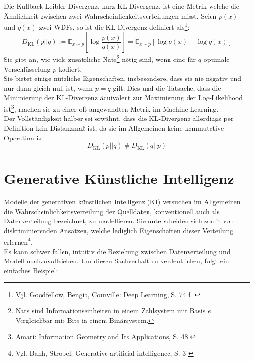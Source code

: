 Die Kullback-Leibler-Divergenz, kurz KL-Divergenz, ist eine Metrik welche die Ähnlichkeit zwischen zwei Wahrscheinlichkeitsverteilungen misst. Seien $p(x)$ und $q(x)$ zwei \ac{WDF}s, so ist die KL-Divergenz definiert als\footnote{
    Vgl. Goodfellow, Bengio, Courville: Deep Learning, S. 74 f.
    \cite{Goodfellow-et-al-2016}
}:
\begin{equation}
    D_\text{KL}(p||q) 
    := \mathbb{E}_{x \sim p} \left [
    \log \frac{p(x)} {q(x)}
    \right ]
    = \mathbb{E}_{x \sim p} \left [ 
        \log p(x) - \log q(x)
        \right ]
\end{equation}
Sie gibt an, wie viele zusätzliche Nats\footnote{
    Nats sind Informationseinheiten in einem Zahlsystem mit Basis $e$. Vergleichbar mit Bits in einem Binärsystem. 
} nötig sind, wenn eine für $q$ optimale Verschlüsselung $p$ kodiert. \\
Sie bietet einige nützliche Eigenschaften, insbesondere, dass sie nie negativ und nur dann gleich null ist, wenn $p = q$ gilt. Dies und die Tatsache, dass die Minimierung der KL-Divergenz äquivalent zur Maximierung der Log-Likelihood ist\footnote{
    Amari: Information Geometry and Its Applications, S. 48
    \cite{10.5555/3019383}
}, machen sie zu einer oft angewandten Metrik im Machine Learning. \\
Der Vollständigkeit halber sei erwähnt, dass die KL-Divergenz allerdings per Definition kein Distanzmaß ist, da sie im Allgemeinen keine kommutative Operation ist.  
\begin{equation}
    D_\text{KL}(p||q) \ne D_\text{KL}(q||p) 
\end{equation}



\section{Generative Künstliche Intelligenz}

Modelle der generativen künstlichen Intelligenz (KI) versuchen im Allgemeinen die Wahrscheinlichkeitsverteilung der Quelldaten, konventionell auch als Datenverteilung bezeichnet, zu modellieren. Sie unterscheiden sich somit von diskriminierenden Ansätzen, welche lediglich Eigenschaften dieser Verteilung erlernen\footnote{
    Vgl. Banh, Strobel: Generative artificial intelligence, S. 3
    \cite{banh2023generative}
}.\\
Es kann schwer fallen, intuitiv die Beziehung zwischen Datenverteilung und Modell nachzuvollziehen. Um diesen Sachverhalt zu verdeutlichen, folgt ein einfaches Beispiel:

